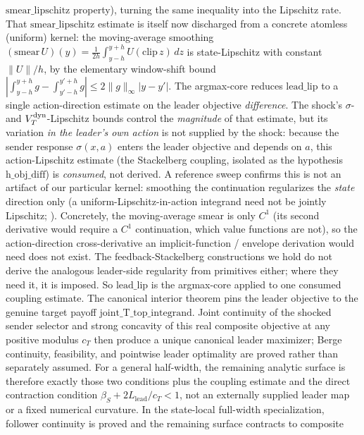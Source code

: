 $\mathrm{smear\_lipschitz}$ property), turning the same inequality into the
Lipschitz rate. That $\mathrm{smear\_lipschitz}$ estimate is itself now
discharged from a concrete atomless (uniform) kernel: the moving-average
smoothing $(\mathrm{smear}\,U)(y)=\tfrac1{2h}\!\int_{y-h}^{y+h}U(\mathrm{clip}\,z)\,dz$
is state-Lipschitz with constant $\|U\|/h$, by the elementary window-shift bound
$|\!\int_{y-h}^{y+h}g-\!\int_{y'-h}^{y'+h}g|\le 2\|g\|_\infty|y-y'|$. The
argmax-core reduces $\mathrm{lead\_lip}$ to a single action-direction estimate
on the leader objective \emph{difference}. The
shock's $\sigma$- and $V_T^{\mathrm{dyn}}$-Lipschitz bounds control
the \emph{magnitude} of that estimate, but its variation \emph{in the leader's
own action} is not supplied by the shock: because the sender response
$\sigma(x,a)$ enters the leader objective and depends on $a$, this
action-Lipschitz estimate (the Stackelberg coupling, isolated as the
hypothesis $\mathrm{h\_obj\_diff}$) is \emph{consumed}, not derived. A
reference sweep confirms this is not an artifact of our particular kernel:
smoothing the continuation regularizes the \emph{state} direction only (a
uniform-Lipschitz-in-action integrand need not be jointly Lipschitz;
\citealp{Hinderer2005}). Concretely, the moving-average smear is only $C^1$
(its second derivative would require a $C^1$ continuation, which value functions
are not), so the action-direction cross-derivative an implicit-function / envelope
derivation \citep[the Lipschitz-policy route of][]{Montrucchio1987} would need
does not exist. The feedback-Stackelberg constructions we hold do not
derive the analogous leader-side regularity from primitives either; where
they need it, it is imposed. So
$\mathrm{lead\_lip}$ is the argmax-core applied to one consumed coupling
estimate. The canonical interior theorem pins the leader objective to the
genuine target payoff $\mathrm{joint\_T\_top\_integrand}$.  Joint continuity
of the shocked sender selector and strong concavity of this real composite
objective at any positive modulus \(c_T\) then produce a unique canonical
leader maximizer; Berge continuity, feasibility, and pointwise leader
optimality are proved rather than separately assumed.  For a general
half-width, the remaining analytic surface is therefore exactly those two
conditions plus the coupling estimate and the direct contraction condition
\(\beta_S+2L_{\mathrm{lead}}/c_T<1\), not an externally supplied leader map or
a fixed numerical curvature.  In the state-local full-width specialization,
follower continuity is proved and the remaining surface contracts to composite
